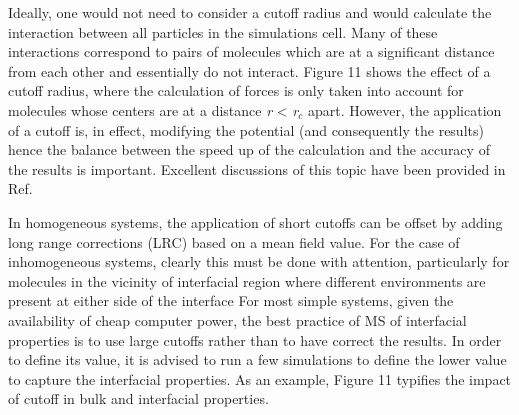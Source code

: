 \documentclass{scrbook}
\begin{document}
Ideally, one would not need to consider a cutoff radius and would calculate the
interaction between all particles in the simulations cell. Many of these
interactions correspond to pairs of molecules which are at a significant
distance from each other and essentially do not interact. Figure 11 shows the
effect of a cutoff radius, where the calculation of forces is only taken into
account for molecules whose centers are at a distance \textit{r} {\textless}
\textit{r}$_{c}$ apart. However, the application of a cutoff is, in effect,
modifying the potential (and consequently the results) hence the balance
between the speed up of the calculation and the accuracy of the results is
important. Excellent discussions of this topic have been provided in Ref.
\citep{holcomb1993,trokhymchuk1999,mecke1997,duque2004,blas2008}

In homogeneous systems, the application of short cutoffs can be offset by
adding long range corrections (LRC) based on a mean field value. For the case
of inhomogeneous systems, clearly this must be done with attention,
particularly for molecules in the vicinity of interfacial region where
different environments are present at either side of the interface
\citep{lotfi1990,janecek2006,siperstein2002,lishchuk2018}
For most simple systems, given the
availability of cheap computer power, the best practice of MS of interfacial
properties is to use large cutoffs rather than to have correct the results. In
order to define its value, it is advised to run a few simulations to define the
lower value to capture the interfacial properties. As an example, Figure 11
typifies the impact of cutoff in bulk and interfacial properties. 
\end{document}
